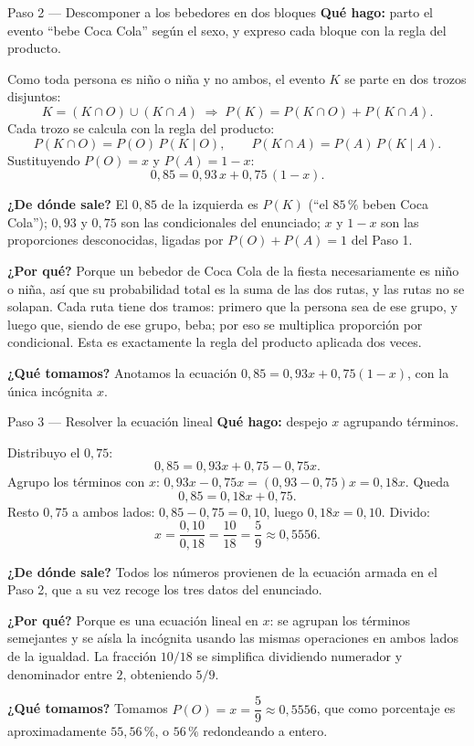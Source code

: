 \documentclass[11pt]{article}
\begin{document}
\begin{paso}{Paso 2 --- Descomponer a los bebedores en dos bloques}
\textbf{Qué hago:} parto el evento ``bebe Coca Cola'' según el sexo, y expreso cada bloque con la regla del producto.

Como toda persona es niño o niña y no ambos, el evento $K$ se parte en dos trozos disjuntos:
\[
K=(K\cap O)\cup(K\cap A)
\;\Longrightarrow\;
P(K)=P(K\cap O)+P(K\cap A).
\]
Cada trozo se calcula con la regla del producto:
\[
P(K\cap O)=P(O)\,P(K\mid O),\qquad P(K\cap A)=P(A)\,P(K\mid A).
\]
Sustituyendo $P(O)=x$ y $P(A)=1-x$:
\[
0{,}85=0{,}93\,x+0{,}75\,(1-x).
\]

\textbf{¿De dónde sale?} El $0{,}85$ de la izquierda es $P(K)$ (``el $85\,\%$ beben Coca Cola''); $0{,}93$ y $0{,}75$ son las condicionales del enunciado; $x$ y $1-x$ son las proporciones desconocidas, ligadas por $P(O)+P(A)=1$ del Paso 1.

\textbf{¿Por qué?} Porque un bebedor de Coca Cola de la fiesta necesariamente es niño o niña, así que su probabilidad total es la suma de las dos rutas, y las rutas no se solapan. Cada ruta tiene dos tramos: primero que la persona sea de ese grupo, y luego que, siendo de ese grupo, beba; por eso se multiplica proporción por condicional. Esta es exactamente la regla del producto aplicada dos veces.

\textbf{¿Qué tomamos?} Anotamos la ecuación $0{,}85=0{,}93x+0{,}75(1-x)$, con la única incógnita $x$.
\end{paso}

\begin{paso}{Paso 3 --- Resolver la ecuación lineal}
\textbf{Qué hago:} despejo $x$ agrupando términos.

Distribuyo el $0{,}75$:
\[
0{,}85=0{,}93x+0{,}75-0{,}75x.
\]
Agrupo los términos con $x$: $0{,}93x-0{,}75x=(0{,}93-0{,}75)x=0{,}18x$. Queda
\[
0{,}85=0{,}18x+0{,}75.
\]
Resto $0{,}75$ a ambos lados: $0{,}85-0{,}75=0{,}10$, luego $0{,}18x=0{,}10$. Divido:
\[
x=\frac{0{,}10}{0{,}18}=\frac{10}{18}=\frac{5}{9}\approx 0{,}5556.
\]

\textbf{¿De dónde sale?} Todos los números provienen de la ecuación armada en el Paso 2, que a su vez recoge los tres datos del enunciado.

\textbf{¿Por qué?} Porque es una ecuación lineal en $x$: se agrupan los términos semejantes y se aísla la incógnita usando las mismas operaciones en ambos lados de la igualdad. La fracción $10/18$ se simplifica dividiendo numerador y denominador entre $2$, obteniendo $5/9$.

\textbf{¿Qué tomamos?} Tomamos $P(O)=x=\dfrac{5}{9}\approx 0{,}5556$, que como porcentaje es aproximadamente $55{,}56\,\%$, o $56\,\%$ redondeando a entero.
\end{paso}
\end{document}
